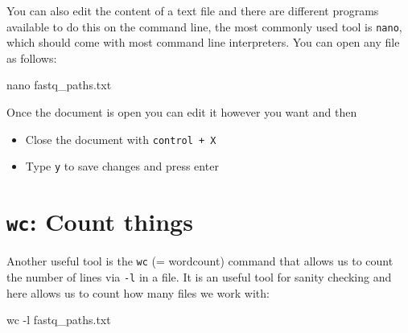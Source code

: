 \documentclass[
  letterpaper,
  DIV=11,
  numbers=noendperiod]{scrreprt}
\newenvironment{Shaded}{}{}
\newcommand{\AttributeTok}[1]{\textcolor[rgb]{0.84,0.23,0.29}{#1}}
\newcommand{\FunctionTok}[1]{\textcolor[rgb]{0.44,0.26,0.76}{#1}}
\newcommand{\NormalTok}[1]{\textcolor[rgb]{0.14,0.16,0.18}{#1}}
\providecommand{\tightlist}{%
  \setlength{\itemsep}{0pt}\setlength{\parskip}{0pt}}\usepackage{longtable,booktabs,array}
\begin{document}
\begin{tcolorbox}[enhanced jigsaw, title=\textcolor{quarto-callout-tip-color}{\faLightbulb}\hspace{0.5em}{Tip: Editing text files}, colframe=quarto-callout-tip-color-frame, opacitybacktitle=0.6, rightrule=.15mm, arc=.35mm, left=2mm, colbacktitle=quarto-callout-tip-color!10!white, bottomrule=.15mm, leftrule=.75mm, toprule=.15mm, opacityback=0, bottomtitle=1mm, colback=white, toptitle=1mm, breakable, titlerule=0mm, coltitle=black]

You can also edit the content of a text file and there are different
programs available to do this on the command line, the most commonly
used tool is \texttt{nano}, which should come with most command line
interpreters. You can open any file as follows:

\begin{Shaded}
\begin{Highlighting}[]
\FunctionTok{nano}\NormalTok{ fastq\_paths.txt}
\end{Highlighting}
\end{Shaded}

Once the document is open you can edit it however you want and then

\begin{itemize}
\tightlist
\item
  Close the document with \texttt{control\ +\ X}
\item
  Type \texttt{y} to save changes and press enter
\end{itemize}

\end{tcolorbox}

\section{\texorpdfstring{\texttt{wc}: Count
things}{wc: Count things}}\label{wc-count-things}

Another useful tool is the \texttt{wc} (= wordcount) command that allows
us to count the number of lines via \texttt{-l} in a file. It is an
useful tool for sanity checking and here allows us to count how many
files we work with:

\begin{Shaded}
\begin{Highlighting}[]
\FunctionTok{wc} \AttributeTok{{-}l}\NormalTok{ fastq\_paths.txt}
\end{Highlighting}
\end{Shaded}
\end{document}
